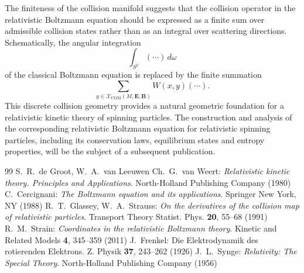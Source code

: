 \documentclass[12pt]{article}
\theoremstyle{plain}
\theoremstyle{definition}
\begin{document}
The finiteness of the collision manifold suggests that the collision operator in the relativistic Boltzmann equation should be expressed as a finite sum over admissible collision states rather than as an integral over scattering directions. Schematically, the angular integration
\[
\int_{S^2}(\cdots)\,d\omega
\]
of the classical Boltzmann equation is replaced by the finite summation
\[
\sum_{y\in\mathcal X_{\mathrm{COM}}(M,{\bm E},{\bm B})}
W(x,y)(\cdots).
\]
This discrete collision geometry provides a natural geometric foundation for a relativistic kinetic theory of spinning particles. 
The construction and analysis of the corresponding relativistic Boltzmann equation for relativistic spinning particles, including its conservation laws, equilibrium states and entropy properties, will be the subject of a subsequent publication.

%
\begin{thebibliography}{99}
 S.~R.~de Groot, W.~A.~van Leeuwen Ch.~G.~van Weert: {\it Relativistic kinetic theory. Principles and Applications}. North-Holland Publishing Company (1980)
 C.~Cercignani: {\it The Boltzmann equation and its applications}. Springer New York, NY (1988)
 R.~T.~Glassey, W.~A.~Strauss: {\it On the derivatives of the collision map of relativistic particles}. Transport Theory Statist. Phys. {\bf 20}, 55--68 (1991)
 R.~M.~Strain: {\it Coordinates in the relativistic Boltzmann theory}. Kinetic and Related Models {\bf 4}, 345--359 (2011)
 J.~Frenkel: Die Elektrodynamik des rotierenden Elektrons. Z. Physik {\bf 37}, 243--262 (1926)
J.~L.~Synge: {\it Relativity: The Special Theory}. North-Holland Publishing Company (1956)

\end{thebibliography}
\end{document}
